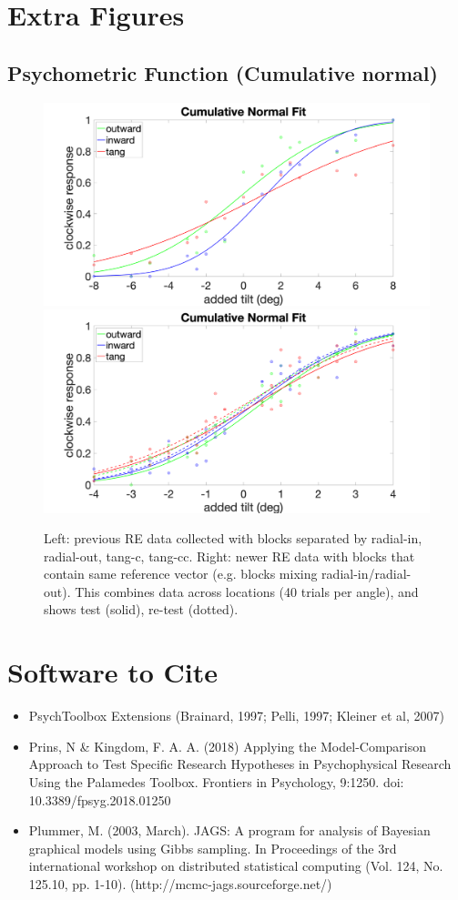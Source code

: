\documentclass[11pt]{article} %
\begin{document}
\section{Extra Figures}
\subsection{Psychometric Function (Cumulative normal)}
\begin{figure}[H]
\centering %
\includegraphics[scale=.08]{Images/PF_angles_old.png}
\includegraphics[scale=.08]{Images/PF_overlayed.png}
\caption{Left: previous RE data collected with blocks separated by radial-in, radial-out, tang-c, tang-cc. Right: newer RE data with blocks that contain same reference vector (e.g. blocks mixing radial-in/radial-out). This combines data across locations (40 trials per angle), and shows test (solid), re-test (dotted).}
\end{figure}

\section{Software to Cite}
\begin{itemize}
\item PsychToolbox Extensions (Brainard, 1997; Pelli, 1997; Kleiner et al, 2007)
\item Prins, N \& Kingdom, F. A. A. (2018) Applying the Model-Comparison Approach to Test Specific Research Hypotheses in Psychophysical Research Using the Palamedes Toolbox. Frontiers in Psychology, 9:1250. doi: 10.3389/fpsyg.2018.01250
\item Plummer, M. (2003, March). JAGS: A program for analysis of Bayesian graphical models using Gibbs sampling. In Proceedings of the 3rd international workshop on distributed statistical computing (Vol. 124, No. 125.10, pp. 1-10). (http://mcmc-jags.sourceforge.net/)
\end{itemize}
\end{document}
